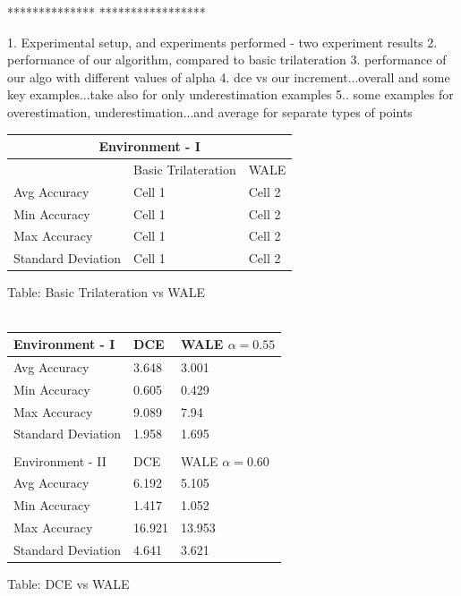 \documentclass[twocolumn, 11pt]{IEEEtran}
\begin{document}
************** *****************

1.  Experimental setup, and experiments performed - two experiment results
2. performance of our algorithm, compared to basic trilateration
3. performance of our algo with different values of alpha
4. dce vs our increment...overall and some key examples...take also for only underestimation examples
5.. some examples for overestimation, underestimation...and average for separate types of points




\begin{tabular}{ |p{3.2cm}|p{1.5cm}|p{2.5cm}|  }
 \hline
 \multicolumn{3}{|c|}{Environment - I} \\
 \hline
  & Basic Trilateration &WALE\\
 \hline
 Avg Accuracy  & Cell 1 & Cell 2\\
 Min Accuracy  & Cell 1 & Cell 2\\
 Max Accuracy  & Cell 1 & Cell 2\\
 Standard Deviation& Cell 1&  Cell 2\\
 \hline
\end{tabular}
\label{tab:BASIC vs WALE}


Table: Basic Trilateration vs WALE
\\
\\

\begin{tabular}{ |p{3.2cm}|p{1cm}|p{2.5cm}|  }
 \hline

 \hline
 Environment - I & DCE &WALE $\alpha = 0.55$\\
 \hline
 Avg Accuracy  & 3.648   & 3.001 \\
 Min Accuracy  & 0.605   & 0.429 \\
 Max Accuracy  & 9.089   & 7.94  \\
 Standard Deviation & 1.958 &  1.695\\
 \hline
 \multicolumn{3}{c}{} \\
 \hline

 \hline
  Environment - II& DCE &WALE  $\alpha = 0.60$\\
 \hline
 Avg Accuracy  & 6.192      & 5.105\\
 Min Accuracy  & 1.417      & 1.052\\
 Max Accuracy  & 16.921     &  13.953\\
 Standard Deviation & 4.641 &  3.621\\
 \hline
\end{tabular}
\label{tab:DCE vs WALE}

Table: DCE vs WALE







\end{document}
